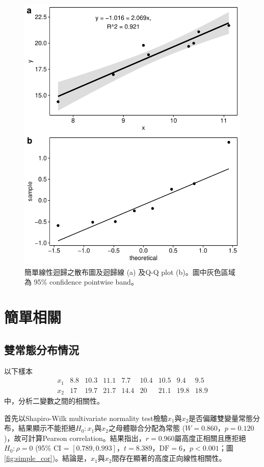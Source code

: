 \documentclass[12pt]{article}
\begin{document}
\begin{figure}[htb!]
	\centering
	\includegraphics[]{simple_regression.pdf}
	\caption{簡單線性迴歸之散布圖及迴歸線 (a) 及Q-Q plot (b)。圖中灰色區域為 95\% confidence pointwise band。}
	\label{fig:simple_regression}
\end{figure}


\section{簡單相關}
\subsection{雙常態分布情況}
以下樣本
\[
\begin{matrix}
x_1 & 8.8 & 10.3 & 11.1 & 7.7 & 10.4 & 10.5 & 9.4 & 9.5\\
x_2 & 17 & 19.7 & 21.7 & 14.4 & 20 & 21.1 & 19.8 & 18.9
\end{matrix}
\]
中，分析二變數之間的相關性。

首先以Shapiro-Wilk multivariate normality test檢驗$x_1$與$x_2$是否偏離雙變量常態分布，結果顯示不能拒絕$H_0: x_1與x_2之母體聯合分配為常態$ ($W = 0.860$，$p = 0.120$)，故可計算Pearson correlation。結果指出，$r = 0.960$屬高度正相關且應拒絕$H_0:\rho=0$ (95\% CI = $\left[ 0.789, 0.993\right]$，$t = 8.389$，$\text{DF} = 6$，$p < 0.001$；圖 \ref{fig:simple_cor})。結論是，$x_1$與$x_2$間存在顯著的高度正向線性相關性。
\end{document}

